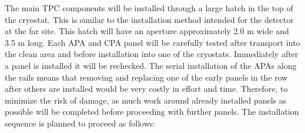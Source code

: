 The main TPC components will be installed through a large hatch in the top of the cryostat.  This is 
similar to the installation method intended for the detector at the far site.  This hatch will have an 
aperture approximately 2.0 m wide and 3.5 m long.  Each APA and CPA panel will be carefully tested after 
transport into the clean area and before installation into one of the cryostats. Immediately after a panel is 
installed it will be rechecked. The serial installation of the APAs along the rails means that removing and 
replacing one of the early panels in the row after others are installed would be very costly in effort and 
time. Therefore, to minimize the risk of damage, as much work around already installed panels as 
possible will be completed before proceeding with further panels.
The installation sequence is planned to proceed as follows:

